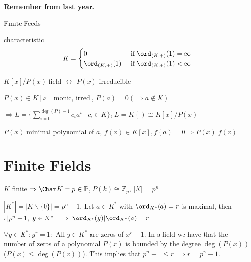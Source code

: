 

\textbf{Remember from last year.}

Finite Feeds

characteristic 
\[K = \begin{cases} 
  0 & \text{ if } \ord_{(K,+)} (1) = \infty \\ 
  \ord_{(K,+)} (1) & \text{ if } \ord_{(K,+)} (1) < \infty \\ 
\end{cases}
\]

$K[x] / P(x)$ field $\leftrightarrow$ $P(x)$ irreducible

$P(x) \in K[x]$ monic, irred., $P(a) = 0 ( \Rightarrow a \not\in K)$

$\Rightarrow L = \{ \sum_{i=0}^{\deg(P)-1} c_i a^i \mid c_i \in K \}$, 
$L = K() \cong K[x] / P(x)$

$P(x)$ minimal polynomial of $a$, $f(x) \in K[x], f(a) = 0 \Rightarrow P(x)|f(x)$ 

\section{Finite Fields}

$K$ finite $\Rightarrow \Char K = p \in \mathbb{P}$, $P(k) \cong \mathbb{Z}_p$, $|K| = p^n$

$|K^{*}| = | K \backslash \{0\}| = p^n -1$. Let $a \in K^{*}$ with $\ord_{K^{*}}(a)=r$ is maximal, then $ r| p^n-1$, 
$y \in K^{*} \implies \ord_{K^{*}}(y) | \ord_{K^{*}}(a) = r$

$\forall y \in K^{*}: y^r = 1:$ All $y \in K^{*}$ are zeros of $x^r -1$. 
In a field we have that the number of zeros of a polynomial $P(x)$ is bounded by the degree $\deg(P(x))$ ($P(x) \leq \deg(P(x))$). This implies that $p^n-1 \leq r \implies r = p^n-1$.

